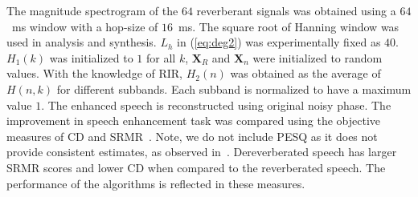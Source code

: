 The magnitude spectrogram of the $64$ reverberant signals was obtained using a $64$~ms window with a hop-size of $16$~ms. The square root of Hanning window was used in analysis and synthesis. $L_h$ in (\ref{eq:deg2}) was experimentally fixed as $40$. $H_1(k)$ was initialized to $1$ for all $k$, $\mathbf{X}_R$ and $\mathbf{X}_n$ were initialized to random values.
With the knowledge of RIR, $H_2(n)$ was obtained as the average of $H(n,k)$ for different subbands. Each subband is normalized to have a maximum value $1$.
The enhanced speech is reconstructed using original noisy phase.
The improvement in speech enhancement task was compared using the objective measures of CD and SRMR~\cite{hu2008evaluation, falk2010non}. Note, we do not include PESQ as it does not provide consistent estimates, as observed in~\cite{kinoshita2016summary}. Dereverberated speech has larger SRMR scores and lower CD when compared to the reverberated speech. The performance of the algorithms is reflected in these measures.
